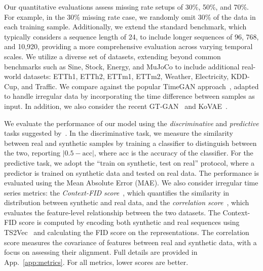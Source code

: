 \documentclass{article}
\theoremstyle{plain}
\theoremstyle{definition}
\theoremstyle{remark}
\begin{document}
Our quantitative evaluations assess missing rate setups of 30\%, 50\%, and 70\%. For example, in the 30\% missing rate case, we randomly omit 30\% of the data in each training sample. Additionally, we extend the standard benchmark, which typically considers a sequence length of 24, to include longer sequences of 96, 768, and 10,920, providing a more comprehensive evaluation across varying temporal scales. We utilize a diverse set of datasets, extending beyond common benchmarks such as Sine, Stock, Energy, and MuJoCo to include additional real-world datasets: ETTh1, ETTh2, ETTm1, ETTm2, Weather, Electricity, KDD-Cup, and Traffic. We compare against the popular TimeGAN approach~\cite{yoon2019time}, adapted to handle irregular data by incorporating the time difference between samples as input. In addition, we also consider the recent GT-GAN~\cite{jeon2022gt} and KoVAE~\cite{naiman2024generative}.


We evaluate the performance of our model using the \emph{discriminative} and \emph{predictive} tasks suggested by~\cite{yoon2019time}. In the discriminative task, we measure the similarity between real and synthetic samples by training a classifier to distinguish between the two, reporting $|0.5 - \text{acc}|$, where $\text{acc}$ is the accuracy of the classifier. For the predictive task, we adopt the ``train on synthetic, test on real'' protocol, where a predictor is trained on synthetic data and tested on real data. The performance is evaluated using the Mean Absolute Error (MAE). We also consider irregular time series metrics: the \emph{Context-FID score}~\cite{jeha2022psa}, which quantifies the similarity in distribution between synthetic and real data, and the \emph{correlation score}~\cite{liao2020conditional}, which evaluates the feature-level relationship between the two datasets. The Context-FID score is computed by encoding both synthetic and real sequences using TS2Vec~\cite{yue2022ts2vec} and calculating the FID score on the representations. The correlation score measures the covariance of features between real and synthetic data, with a focus on assessing their alignment. Full details are provided in App.~\ref{app:metrics}. For all metrics, lower scores are better.
\end{document}

